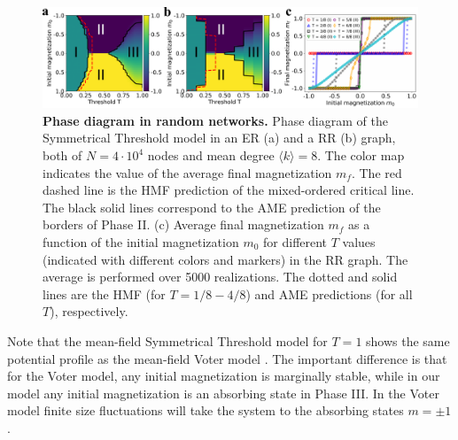 	\begin{figure}[t]
		\centering
		\includegraphics[width=\linewidth]{Figs/Aging_STM/FIG2.pdf}
		\caption{\textbf{Phase diagram in random networks.} \label{ER_REG_PD} Phase diagram of the Symmetrical Threshold model in an ER (a) and a RR (b) graph, both of $N=4\cdot10^4$ nodes and mean degree $\langle k \rangle=8$. The color map indicates the value of the average final magnetization $m_f$. The red dashed line is the HMF prediction of the mixed-ordered critical line. The black solid lines correspond to the AME prediction of the borders of Phase II. (c) Average final magnetization $m_f$ as a function of the initial magnetization $m_0$ for different $T$ values (indicated with different colors and markers) in the RR graph. The average is performed over 5000 realizations. The dotted and solid lines are the HMF (for $T=1/8 - 4/8$) and AME predictions (for all $T$), respectively.}
	\end{figure}
	
	
	Note that the mean-field Symmetrical Threshold model for $T=1$ shows the same potential profile as the mean-field Voter model \cite{Suchecki-2005, Voter-original, Voter}. The important difference is that for the Voter model, any initial magnetization is marginally stable, while in our model any initial magnetization is an absorbing state in Phase III. In the Voter model finite size fluctuations will take the system to the absorbing states $m=\pm 1$. 
	
	
